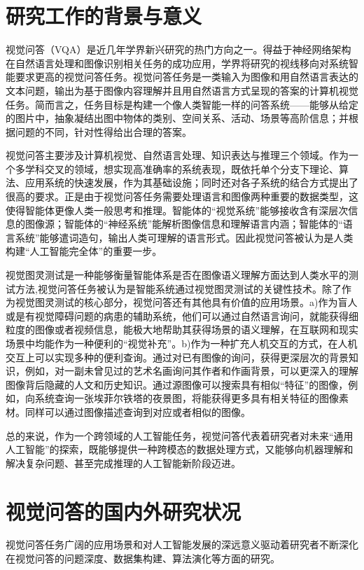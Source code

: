 \thesischapterexordium

\section{研究工作的背景与意义}

视觉问答（VQA）是近几年学界新兴研究的热门方向之一。得益于神经网络架构在自然语言处理和图像识别相关任务的成功应用，学界将研究的视线移向对系统智能要求更高的视觉问答任务。视觉问答任务是一类输入为图像和用自然语言表达的文本问题，输出为基于图像内容理解并且用自然语言方式呈现的答案的计算机视觉任务。简而言之，任务目标是构建一个像人类智能一样的问答系统——能够从给定的图片中，抽象凝结出图中物体的类别、空间关系、活动、场景等高阶信息；并根据问题的不同，针对性得给出合理的答案。

视觉问答主要涉及计算机视觉、自然语言处理、知识表达与推理三个领域。作为一个多学科交叉的领域，想实现高准确率的系统表现，既依托单个分支下理论、算法、应用系统的快速发展，作为其基础设施；同时还对各子系统的结合方式提出了很高的要求。正是由于视觉问答任务需要处理语言和图像两种重要的数据类型，这使得智能体更像人类一般思考和推理。智能体的“视觉系统”能够接收含有深层次信息的图像源；智能体的“神经系统”能解析图像信息和理解语言内涵；智能体的“语言系统”能够遣词造句，输出人类可理解的语言形式。因此视觉问答被认为是人类构建“人工智能完全体”的重要一步。

视觉图灵测试是一种能够衡量智能体系是否在图像语义理解方面达到人类水平的测试方法,视觉问答任务被认为是智能系统通过视觉图灵测试的关键性技术。除了作为视觉图灵测试的核心部分，视觉问答还有其他具有价值的应用场景。a)作为盲人或是有视觉障碍问题的病患的辅助系统，他们可以通过自然语言询问，就能获得细粒度的图像或者视频信息，能极大地帮助其获得场景的语义理解，在互联网和现实场景中均能作为一种便利的“视觉补充”。b)作为一种扩充人机交互的方式，在人机交互上可以实现多种的便利查询。通过对已有图像的询问，获得更深层次的背景知识，例如，对一副未曾见过的艺术名画询问其作者和作画背景，可以更深入的理解图像背后隐藏的人文和历史知识。通过源图像可以搜索具有相似“特征”的图像，例如，向系统查询一张埃菲尔铁塔的夜景图，将能获得更多具有相关特征的图像素材。同样可以通过图像描述查询到对应或者相似的图像。

总的来说，作为一个跨领域的人工智能任务，视觉问答代表着研究者对未来“通用人工智能”的探索，既能够提供一种跨模态的数据处理方式，又能够向机器理解和解决复杂问题、甚至完成推理的人工智能新阶段迈进。


\section{视觉问答的国内外研究状况}
视觉问答任务广阔的应用场景和对人工智能发展的深远意义驱动着研究者不断深化在视觉问答的问题深度、数据集构建、算法演化等方面的研究。

